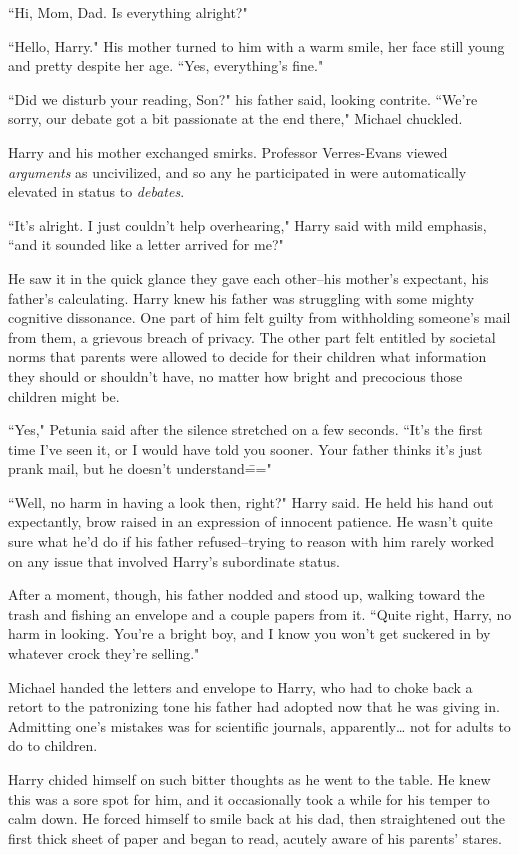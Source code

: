 ``Hi, Mom, Dad. Is everything alright?"

``Hello, Harry." His mother turned to him with a warm smile, her face still young and pretty despite her age. ``Yes, everything's fine."

``Did we disturb your reading, Son?" his father said, looking contrite. ``We're sorry, our debate got a bit passionate at the end there," Michael chuckled.

Harry and his mother exchanged smirks. Professor Verres-Evans viewed \emph{arguments} as uncivilized, and so any he participated in were automatically elevated in status to \emph{debates}.

``It's alright. I just couldn't help overhearing," Harry said with mild emphasis, ``and it sounded like a letter arrived for me?"

He saw it in the quick glance they gave each other\---his mother's expectant, his father's calculating. Harry knew his father was struggling with some mighty cognitive dissonance. One part of him felt guilty from withholding someone's mail from them, a grievous breach of privacy. The other part felt entitled by societal norms that parents were allowed to decide for their children what information they should or shouldn't have, no matter how bright and precocious those children might be.

``Yes," Petunia said after the silence stretched on a few seconds. ``It's the first time I've seen it, or I would have told you sooner. Your father thinks it's just prank mail, but he doesn't understand\==="

``Well, no harm in having a look then, right?" Harry said. He held his hand out expectantly, brow raised in an expression of innocent patience. He wasn't quite sure what he'd do if his father refused\---trying to reason with him rarely worked on any issue that involved Harry's subordinate status.

After a moment, though, his father nodded and stood up, walking toward the trash and fishing an envelope and a couple papers from it. ``Quite right, Harry, no harm in looking. You're a bright boy, and I know you won't get suckered in by whatever crock they're selling."

Michael handed the letters and envelope to Harry, who had to choke back a retort to the patronizing tone his father had adopted now that he was giving in. Admitting one's mistakes was for scientific journals, apparently{\ldots} not for adults to do to children.

Harry chided himself on such bitter thoughts as he went to the table. He knew this was a sore spot for him, and it occasionally took a while for his temper to calm down. He forced himself to smile back at his dad, then straightened out the first thick sheet of paper and began to read, acutely aware of his parents' stares. 

